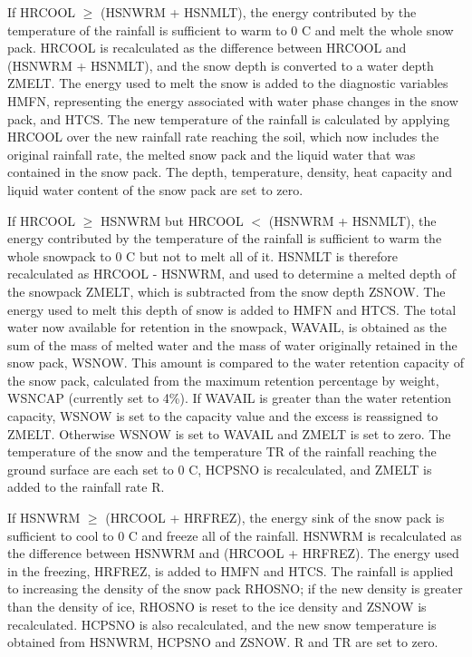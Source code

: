 If H\+R\+C\+O\+O\+L $\geq$ (H\+S\+N\+W\+R\+M + H\+S\+N\+M\+L\+T), the energy contributed by the temperature of the rainfall is sufficient to warm to 0 C and melt the whole snow pack. H\+R\+C\+O\+O\+L is recalculated as the difference between H\+R\+C\+O\+O\+L and (H\+S\+N\+W\+R\+M + H\+S\+N\+M\+L\+T), and the snow depth is converted to a water depth Z\+M\+E\+L\+T. The energy used to melt the snow is added to the diagnostic variables H\+M\+F\+N, representing the energy associated with water phase changes in the snow pack, and H\+T\+C\+S. The new temperature of the rainfall is calculated by applying H\+R\+C\+O\+O\+L over the new rainfall rate reaching the soil, which now includes the original rainfall rate, the melted snow pack and the liquid water that was contained in the snow pack. The depth, temperature, density, heat capacity and liquid water content of the snow pack are set to zero.

If H\+R\+C\+O\+O\+L $\geq$ H\+S\+N\+W\+R\+M but H\+R\+C\+O\+O\+L $<$ (H\+S\+N\+W\+R\+M + H\+S\+N\+M\+L\+T), the energy contributed by the temperature of the rainfall is sufficient to warm the whole snowpack to 0 C but not to melt all of it. H\+S\+N\+M\+L\+T is therefore recalculated as H\+R\+C\+O\+O\+L -\/ H\+S\+N\+W\+R\+M, and used to determine a melted depth of the snowpack Z\+M\+E\+L\+T, which is subtracted from the snow depth Z\+S\+N\+O\+W. The energy used to melt this depth of snow is added to H\+M\+F\+N and H\+T\+C\+S. The total water now available for retention in the snowpack, W\+A\+V\+A\+I\+L, is obtained as the sum of the mass of melted water and the mass of water originally retained in the snow pack, W\+S\+N\+O\+W. This amount is compared to the water retention capacity of the snow pack, calculated from the maximum retention percentage by weight, W\+S\+N\+C\+A\+P (currently set to 4\%). If W\+A\+V\+A\+I\+L is greater than the water retention capacity, W\+S\+N\+O\+W is set to the capacity value and the excess is reassigned to Z\+M\+E\+L\+T. Otherwise W\+S\+N\+O\+W is set to W\+A\+V\+A\+I\+L and Z\+M\+E\+L\+T is set to zero. The temperature of the snow and the temperature T\+R of the rainfall reaching the ground surface are each set to 0 C, H\+C\+P\+S\+N\+O is recalculated, and Z\+M\+E\+L\+T is added to the rainfall rate R.

If H\+S\+N\+W\+R\+M $\geq$ (H\+R\+C\+O\+O\+L + H\+R\+F\+R\+E\+Z), the energy sink of the snow pack is sufficient to cool to 0 C and freeze all of the rainfall. H\+S\+N\+W\+R\+M is recalculated as the difference between H\+S\+N\+W\+R\+M and (H\+R\+C\+O\+O\+L + H\+R\+F\+R\+E\+Z). The energy used in the freezing, H\+R\+F\+R\+E\+Z, is added to H\+M\+F\+N and H\+T\+C\+S. The rainfall is applied to increasing the density of the snow pack R\+H\+O\+S\+N\+O; if the new density is greater than the density of ice, R\+H\+O\+S\+N\+O is reset to the ice density and Z\+S\+N\+O\+W is recalculated. H\+C\+P\+S\+N\+O is also recalculated, and the new snow temperature is obtained from H\+S\+N\+W\+R\+M, H\+C\+P\+S\+N\+O and Z\+S\+N\+O\+W. R and T\+R are set to zero.

